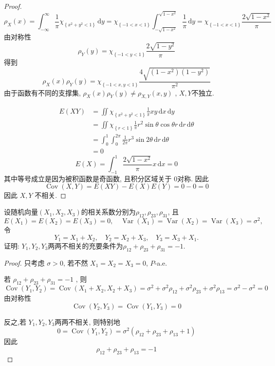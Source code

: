 \documentclass[../main.tex]{subfiles}
\begin{document}
\begin{proof}
  \[
  \rho _{X}\left( x \right)= \int_{-\infty}^{\infty}\frac{1 }{ \pi  }\chi _{\left\{ x^{2}+ y^{2}< 1 \right\}}\,\mathrm{d} y= \chi _{\left\{ -1< x< 1 \right\}}\int_{-\sqrt{1-x^{2}}}^{\sqrt{1-x^{2}}}  \frac{1 }{ \pi  }\,\mathrm{d} y= \chi _{\left\{ -1< x< 1 \right\}}\frac{2\sqrt{1-x^{2}} }{ \pi  }  
  \]由对称性 \[
  \rho _{Y}\left( y \right)=  \chi _{\left\{ -1< y< 1 \right\}}\frac{2\sqrt{1-y^{2}} }{ \pi  }  
  \]得到 \[
  \rho _{X}\left( x \right)\rho _{Y}\left( y \right)= \chi _{\left\{ -1< x,y< 1 \right\}}  \frac{4\sqrt{\left( 1-x^{2} \right)\left( 1-y^{2} \right)  } }{ \pi ^{2} } 
  \]由于函数有不同的支撑集, \(  \rho _{X}\left( x \right)\rho _{Y}\left( y \right)\neq \rho _{X,Y}\left( x,y \right)     \) , \(  X,Y  \)不独立.
  
  \[
  \begin{aligned}
  E\left( XY \right)&= \iint\chi _{\left\{ x^{2}+ y^{2}< 1 \right\}}\frac{1 }{ \pi  }xy\,\mathrm{d} x\,\mathrm{d} y   \\ 
   &= \iint \chi _{\left\{ r< 1 \right\}}\frac{1 }{ \pi  } r^{2}\sin  \theta \cos  \theta r\,\mathrm{d} r\,\mathrm{d}  \theta \\ 
    &= \int_{0}^{1}\int_{0}^{2 \pi }\frac{1 }{2 \pi  }  r^{3}\sin 2 \theta \,\mathrm{d} r\,\mathrm{d}  \theta \\ 
     &= 0
  \end{aligned}
  \] \[
  E\left( X \right) = \int_{-1}^{1}\frac{2\sqrt{1-x^{2}} }{ \pi  }x\,\mathrm{d} x= 0 
  \]其中等号成立是因为被积函数是奇函数, 且积分区域关于 \(  0  \)对称. 因此 \[
  \operatorname{Cov}\left( X,Y \right)= E\left( XY \right)-E\left( X \right)E\left( Y \right)= 0-0= 0    
  \] 因此 \(  X,Y  \) 不相关.
\end{proof}

\begin{exercise}{}{}
设随机向量\((X_1,X_2,X_3)\)的相关系数分别为\(\rho_{12},\rho_{23},\rho_{31}\), 且
\[
E(X_1)=E(X_2)=E(X_3)=0,\quad \operatorname{Var}(X_1)=\operatorname{Var}(X_2)=\operatorname{Var}(X_3)=\sigma^2,
\]
令
\[
Y_1=X_1+X_2,\quad Y_2=X_2+X_3,\quad Y_3=X_3+X_1.
\]
证明: \(Y_1,Y_2,Y_3\)两两不相关的充要条件为\(\rho_{12}+\rho_{23}+\rho_{31}=-1\).
\end{exercise}

\begin{proof}
  只考虑 \(   \sigma > 0  \), 若不然 \(  X_1= X_2= X_3= 0  \), \(  P  \)-a.e.    

  若 \(  \rho _{12}+ \rho _{23}+ \rho _{31}= -1  \) , 则
  \[
  \operatorname{Cov}\left( Y_1,Y_2 \right)= \operatorname{Cov}\left( X_1+ X_2,X_2+ X_3 \right)  =  \sigma ^{2}+  \sigma ^{2}\rho _{12}+  \sigma ^{2}\rho _{23}+  \sigma ^{2}\rho _{13}=  \sigma ^{2}- \sigma ^{2}= 0
  \]由对称性 \[
  \operatorname{Cov}\left( Y_2,Y_3 \right)= \operatorname{Cov}\left( Y_1,Y_3 \right)= 0  
  \]

  反之,若  \(  Y_1,Y_2,Y_3  \)两两不相关, 则特别地 \[
 0=  \operatorname{Cov}\left( Y_1,Y_2 \right)=  \sigma ^{2}\left(  \rho _{12}+ \rho _{23}+ \rho _{13}+ 1\right)  
  \] 因此 \[
  \rho _{12}+ \rho _{23}+ \rho _{13}= -1
  \]
\end{proof}
\end{document}
